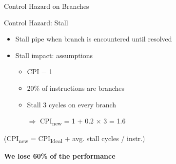 \documentclass[aspectratio=169,12pt]{beamer}
\begin{document}
\begin{frame}{Control Hazard on Branches}
{
    }
\end{frame}

\begin{frame}{Control Hazard: Stall}
    \begin{itemize}
        \item Stall pipe when branch is encountered until resolved
        \item Stall impact: assumptions
        \begin{itemize}
            \item CPI = 1
            \item 20\% of instructions are branches
            \item Stall 3 cycles on every branch
            \item[$\Rightarrow$] CPI\textsubscript{new} = 1 + 0.2 × 3 = 1.6
        \end{itemize}
    \end{itemize}
    
    \vspace{0.5cm}
    \centering
    (CPI\textsubscript{new} = CPI\textsubscript{Ideal} + avg. stall cycles / instr.)
    
    \vspace{0.5cm}
    \textbf{We lose 60\% of the performance}
\end{frame}
\end{document}
